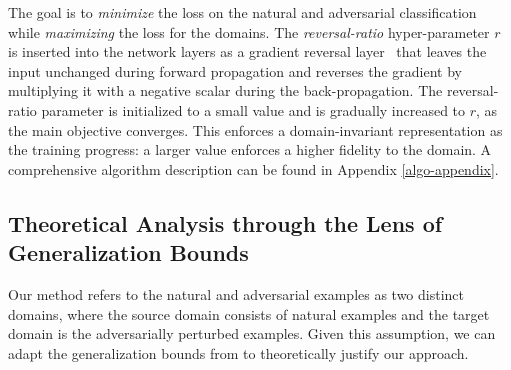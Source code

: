 The goal is to \textit{minimize} the loss on the natural and adversarial classification while \textit{maximizing} the loss for the domains. 
The {\em reversal-ratio} hyper-parameter %
$r$
is inserted into the network layers as a gradient reversal layer~\citep{ ganin2015unsupervised, ganin2016domain}  that leaves the input unchanged
during forward propagation and reverses the gradient by multiplying it with a negative scalar
during the back-propagation. 
The reversal-ratio parameter is initialized to a small value and is gradually increased to $r$, as the main objective converges.
This enforces a domain-invariant representation as the training progress: a larger value enforces a higher fidelity to the domain.
A comprehensive algorithm description can be found in Appendix \ref{algo-appendix}.



\subsection{Theoretical Analysis through the Lens of Generalization Bounds}
\label{theory}
Our method refers to the natural and adversarial examples as two distinct domains, where the source domain consists of natural examples and the target domain is the adversarially perturbed examples. Given this assumption, we can adapt the generalization bounds from \citet{mansour2009domain} to theoretically justify our approach.

